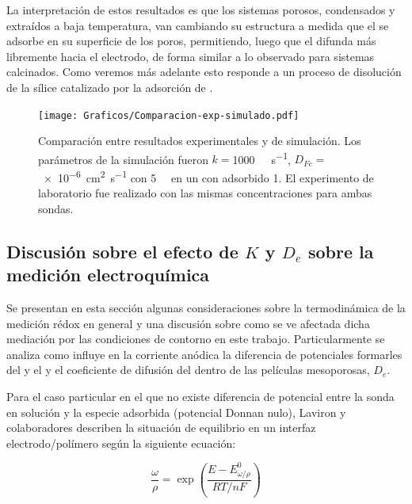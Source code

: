 		La interpretación de estos resultados es que los sistemas porosos, condensados y extraídos a baja temperatura, van cambiando su estructura a medida que el \ru\space se adsorbe en su superficie de los poros, permitiendo, luego que el \fc\space difunda más libremente hacia el electrodo, de forma similar a lo observado para sistemas calcinados. Como veremos más adelante esto responde a un proceso de disolución de la sílice catalizado por la adsorción de \aminorutenio.

				\begin{figure}[t!]
					\centering
			 	    \texttt{[image: Graficos/Comparacion-exp-simulado.pdf]}
			        \caption[Simulación EQ comparadas con datos experimentales]{Comparación entre resultados experimentales y de simulación. Los parámetros de la simulación fueron $k=$\SI{1000}{\per\Molar\per\second}, $D_{Fc}\!=$ \SI{e-6}{\square\cm\per\second} con \fc\space \SI{5}{\milli\Molar} en un \pdm\space con \ru\space adsorbido \SI{1}{\Molar}. El experimento de laboratorio fue realizado con las mismas concentraciones para ambas sondas.}
			        \label{fig:comp_sim_exp}
			      	\end{figure}

	\subsection{Discusión sobre el efecto de \texorpdfstring{$K$}{K} y \texorpdfstring{$D_e$}{De} sobre la medición electroquímica}

		Se presentan en esta sección algunas consideraciones sobre la termodinámica de la medición rédox en general y una discusión sobre como se ve afectada dicha mediación por las condiciones de contorno en este trabajo. Particularmente se analiza como influye en la corriente anódica la diferencia de potenciales formarles del \ru\space y el \fc\space y el coeficiente de difusión del \ru\space dentro de las películas mesoporosas, $D_e$.

		Para el caso particular en el que no existe diferencia de potencial entre la sonda en solución y la especie adsorbida (potencial Donnan nulo), Laviron y colaboradores\cite{laviron1983} describen la situación de equilibrio en un interfaz electrodo/polímero según la siguiente ecuación:

			\begin{equation}
				\frac{\omega}{\rho} = \exp{\left(\frac{E-E_{\omega / \rho}^{0}}{RT/nF}\right)}
				\label{eq:laviron}
			\end{equation}

